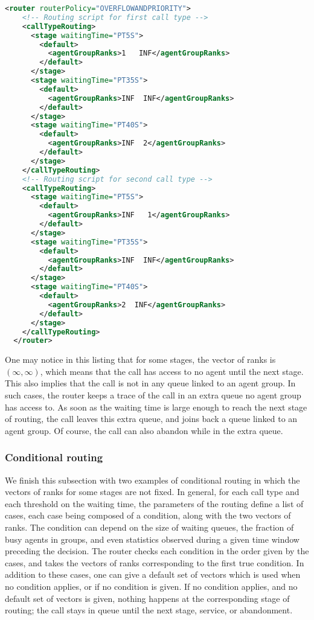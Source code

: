 \begin{lstlisting}[caption={Part of \texttt{op-twoQueues-slowOv.xml}:
    parameters of a routing policy including routing delays and
    transfer times},
language=XML, label=par:op-twoQueues-slowOv]
  <router routerPolicy="OVERFLOWANDPRIORITY">
    <!-- Routing script for first call type -->
    <callTypeRouting>
      <stage waitingTime="PT5S">
        <default>
          <agentGroupRanks>1   INF</agentGroupRanks>
        </default>
      </stage>
      <stage waitingTime="PT35S">
        <default>
          <agentGroupRanks>INF  INF</agentGroupRanks>
        </default>
      </stage>
      <stage waitingTime="PT40S">
        <default>
          <agentGroupRanks>INF  2</agentGroupRanks>
        </default>
      </stage>
    </callTypeRouting>
    <!-- Routing script for second call type -->
    <callTypeRouting>
      <stage waitingTime="PT5S">
        <default>
          <agentGroupRanks>INF   1</agentGroupRanks>
        </default>
      </stage>
      <stage waitingTime="PT35S">
        <default>
          <agentGroupRanks>INF  INF</agentGroupRanks>
        </default>
      </stage>
      <stage waitingTime="PT40S">
        <default>
          <agentGroupRanks>2  INF</agentGroupRanks>
        </default>
      </stage>
    </callTypeRouting>
  </router>
\end{lstlisting}

One may notice in this listing that for some stages, the vector of
ranks is $(\infty, \infty)$, which means that the call has access to
no agent until the next stage. This also implies that the call is not
in any queue linked to an agent group.
In such cases, the router keeps a trace of the call in an extra queue
no agent group has access to.  As soon as the waiting time is large
enough to reach the next stage of routing, the call leaves this extra
queue, and joins back a queue linked to an agent group.
Of course, the call can also abandon while in the extra queue.

\subsubsection{Conditional routing}

We finish this subsection with two examples of conditional routing in
which the vectors of ranks for some stages are not fixed.
In general,
for each call type and each threshold on the waiting time, the
parameters of the routing define a list of cases, each case being
composed of a
condition, along with the two vectors of ranks.
The condition can depend on the size of waiting queues, the fraction of
busy agents in groups, and even statistics observed during a given
time window preceding the decision.
The router checks each condition in the order given by the cases, and
takes the vectors of ranks corresponding to the first true condition.
In addition to these cases, one can give a default set of vectors
which is used when no condition applies, or if no condition is given.
If no condition applies, and no default set of vectors is given, nothing
happens at the corresponding stage of routing; the call stays in queue
until the next stage, service, or abandonment.

